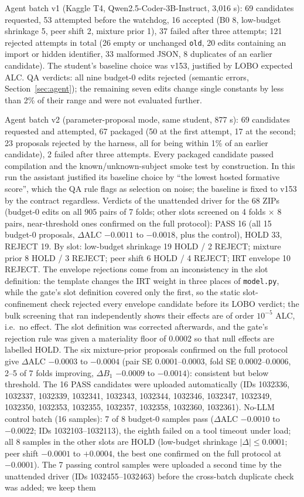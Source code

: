 \documentclass{article}
\begin{document}
Agent batch v1 (Kaggle T4, Qwen2.5-Coder-3B-Instruct, 3{,}016 s): 69 candidates requested, 53 attempted before the watchdog, 16 accepted (B0 8, low-budget shrinkage 5, peer shift 2, mixture prior 1), 37 failed after three attempts; 121 rejected attempts in total (26 empty or unchanged \texttt{old}, 20 edits containing an import or hidden identifier, 33 malformed JSON, 8 duplicates of an earlier candidate). The student's baseline choice was v153, justified by LOBO expected ALC. QA verdicts: all nine budget-0 edits rejected (semantic errors, Section~\ref{sec:agent}); the remaining seven edits change single constants by less than 2\% of their range and were not evaluated further.

Agent batch v2 (parameter-proposal mode, same student, 877 s): 69 candidates requested and attempted, 67 packaged (50 at the first attempt, 17 at the second; 23 proposals rejected by the harness, all for being within 1\% of an earlier candidate), 2 failed after three attempts. Every packaged candidate passed compilation and the known/unknown-subject smoke test by construction. In this run the assistant justified its baseline choice by ``the lowest hosted formative score'', which the QA rule flags as selection on noise; the baseline is fixed to v153 by the contract regardless. Verdicts of the unattended driver for the 68 ZIPs (budget-0 edits on all 905 pairs of 7 folds; other slots screened on 4 folds $\times$ 8 pairs, near-threshold ones confirmed on the full protocol): PASS 16 (all 15 budget-0 proposals, $\Delta\text{ALC}$ $-0.0011$ to $-0.0018$, plus the control), HOLD 33, REJECT 19. By slot: low-budget shrinkage 19 HOLD / 2 REJECT; mixture prior 8 HOLD / 3 REJECT; peer shift 6 HOLD / 4 REJECT; IRT envelope 10 REJECT. The envelope rejections come from an inconsistency in the slot definition: the template changes the IRT weight in three places of \texttt{model.py}, while the gate's slot definition covered only the first, so the static slot-confinement check rejected every envelope candidate before its LOBO verdict; the bulk screening that ran independently shows their effects are of order $10^{-5}$ ALC, i.e.\ no effect. The slot definition was corrected afterwards, and the gate's rejection rule was given a materiality floor of 0.0002 so that null effects are labelled HOLD. The six mixture-prior proposals confirmed on the full protocol give $\Delta\text{ALC}$ $-0.0003$ to $-0.0004$ (pair SE 0.0001--0.0003, fold SE 0.0002--0.0006, 2--5 of 7 folds improving, $\Delta B_1$ $-0.0009$ to $-0.0014$): consistent but below threshold. The 16 PASS candidates were uploaded automatically (IDs 1032336, 1032337, 1032339, 1032341, 1032343, 1032344, 1032346, 1032347, 1032349, 1032350, 1032353, 1032355, 1032357, 1032358, 1032360, 1032361). No-LLM control batch (16 samples): 7 of 8 budget-0 samples pass ($\Delta\text{ALC}$ $-0.0010$ to $-0.0022$; IDs 1032103--1032113), the eighth failed on a tool timeout under load; all 8 samples in the other slots are HOLD (low-budget shrinkage $|\Delta|\le0.0001$; peer shift $-0.0001$ to $+0.0004$, the best one confirmed on the full protocol at $-0.0001$). The 7 passing control samples were uploaded a second time by the unattended driver (IDs 1032455--1032463) before the cross-batch duplicate check was added; we keep them 
\end{document}
